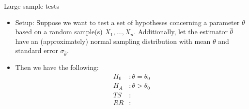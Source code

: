 \documentclass{article}
\newcommand{\ho}{H_0}		%
\newcommand{\ha}{H_A}		%
\newcommand{\vecn}[2]{#1_1, \ldots, #1_{#2}}	%
\begin{document}
Large sample tests\bigskip
\begin{itemize}
    \item Setup: Suppose we want to test a set of hypotheses concerning a parameter $\theta$ based on a random sample(s) $\vecn{X}{n}$. Additionally, let the estimator $\hat{\theta}$ have an (approximately) normal sampling distribution with mean $\theta$ and standard error $\sigma_{\hat{\theta}}$.\vspace{150pt}
    \item Then we have the following:
    \begin{align*}
        \ho &: \theta = \theta_0\\
        \ha &: \theta > \theta_0\\
        TS &: \\
        RR &: \\
    \end{align*}
    \begin{figure}[H]


\end{figure}
\end{itemize}
\end{document}
